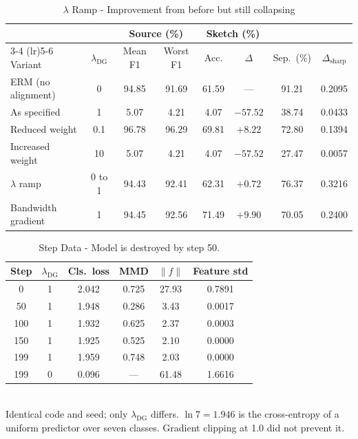 \documentclass{article}
\begin{document}
\begin{table}[H]
  \caption{$\lambda$ Ramp - Improvement from before but still collapsing}
  \label{tab:dandg-variants}
  \centering
  \footnotesize
  \begin{tabular}{lccccccc}
    \toprule
    & & \multicolumn{2}{c}{Source (\%)} & \multicolumn{2}{c}{Sketch (\%)} & & \\
    \cmidrule(lr){3-4} \cmidrule(lr){5-6}
    Variant & $\lambda_{\mathrm{DG}}$ & Mean F1 & Worst F1 & Acc. & $\Delta$ & Sep.\ (\%) & $\Delta_{\mathrm{sharp}}$ \\
    \midrule
    ERM (no alignment)       & 0      & 94.85 & 91.69 & 61.59 & ---      & 91.21 & 0.2095 \\
    As specified             & 1      &  5.07 &  4.21 &  4.07 & $-57.52$ & 38.74 & 0.0433 \\
    Reduced weight           & 0.1    & 96.78 & 96.29 & 69.81 & $+8.22$  & 72.80 & 0.1394 \\
    Increased weight         & 10     &  5.07 &  4.21 &  4.07 & $-57.52$ & 27.47 & 0.0057 \\
    $\lambda$ ramp           & 0 to 1 & 94.43 & 92.41 & 62.31 & $+0.72$  & 76.37 & 0.3216 \\
    Bandwidth gradient       & 1      & 94.45 & 92.56 & 71.49 & $+9.90$  & 70.05 & 0.2400 \\
    \bottomrule
  \end{tabular}
\end{table}

\begin{table}[H]
  \caption{Step Data - Model is destroyed by step 50.}
  \label{tab:dandg-collapse}
  \centering
  \begin{tabular}{cccccc}
    \toprule
    Step & $\lambda_{\mathrm{DG}}$ & Cls.\ loss & MMD & $\|f\|$ & Feature std \\
    \midrule
    0   & 1 & 2.042 & 0.725 & 27.93 & 0.7891 \\
    50  & 1 & 1.948 & 0.286 &  3.43 & 0.0017 \\
    100 & 1 & 1.932 & 0.625 &  2.37 & 0.0003 \\
    150 & 1 & 1.925 & 0.525 &  2.10 & 0.0000 \\
    199 & 1 & 1.959 & 0.748 &  2.03 & 0.0000 \\
    \midrule
    199 & 0 & 0.096 & ---   & 61.48 & 1.6616 \\
    \bottomrule
  \end{tabular}
  \\[2pt]
  \footnotesize Identical code and seed; only $\lambda_{\mathrm{DG}}$ differs. $\ln 7 = 1.946$ is the
  cross-entropy of a uniform predictor over seven classes. Gradient clipping at 1.0 did not prevent it.
\end{table}
\end{document}

